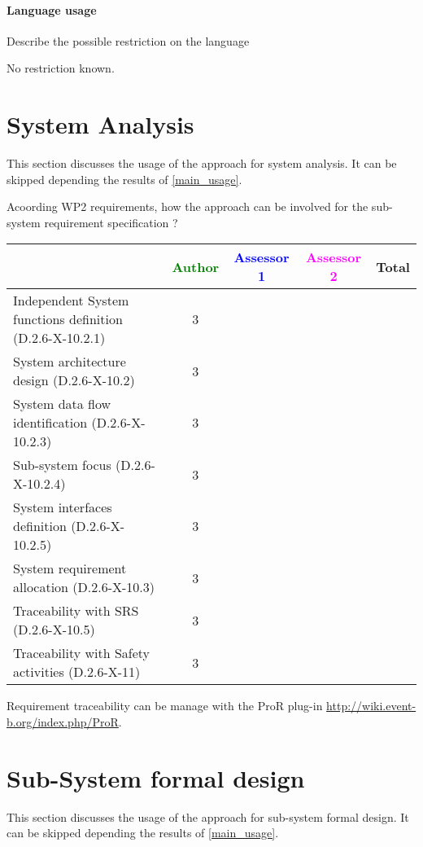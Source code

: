 \paragraph{Language usage} Describe the possible restriction on the language

\begin{author_comment}
No restriction known.
\end{author_comment}

\section{System Analysis}
This section discusses the usage of the approach for system analysis.
It can be skipped depending the results of \ref{main_usage}.

Acoording WP2 requirements, how the approach can be involved for the sub-system requirement specification ?

\begin{tabular}{|l | c | c | c | c|}
\hline
& \textcolor{green}{Author} & \textcolor{blue}{Assessor 1} & \textcolor{magenta}{Assessor 2} & Total \\
\hline
Independent System functions definition (D.2.6-X-10.2.1)  & 3 & & &  \\
\hline 
System architecture design (D.2.6-X-10.2) & 3 & & &  \\
\hline
System data flow identification (D.2.6-X-10.2.3)  & 3 & & &  \\
\hline
Sub-system focus (D.2.6-X-10.2.4)  & 3 & & &  \\
\hline
System interfaces definition (D.2.6-X-10.2.5)  & 3 & & &  \\
\hline
System requirement allocation (D.2.6-X-10.3)  & 3 & & &  \\
\hline
Traceability with SRS (D.2.6-X-10.5)  & 3 & & &  \\
\hline
Traceability with Safety activities (D.2.6-X-11)  & 3 & & &  \\
\hline
\end{tabular}

\begin{author_comment}
Requirement traceability can be manage with the ProR plug-in \url{http://wiki.event-b.org/index.php/ProR}.
\end{author_comment}

\section{Sub-System formal design}
This section discusses the usage of the approach for sub-system formal design.
It can be skipped depending the results of \ref{main_usage}.


